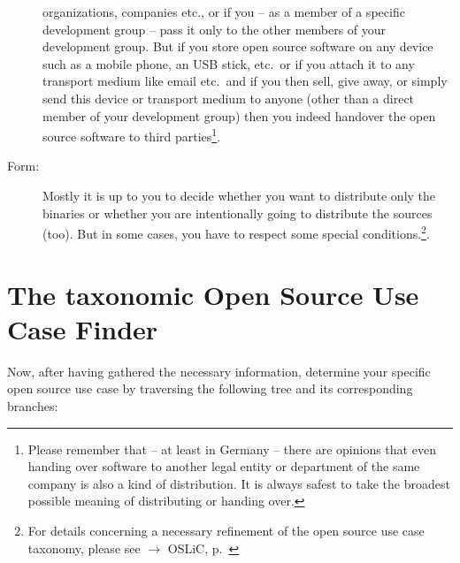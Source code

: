 \begin{description}
organizations, companies etc., or if you -- as a member of a specific
development group -- pass it only to the other members of your development
group. But if you store open source software on any device such as a mobile
phone, an USB stick, etc.\ or if you attach it to any transport medium like
email etc.\ and if you then sell, give away, or simply send this device or
transport medium to anyone (other than a direct member of your development
group) then you indeed handover the open source software to third
parties\footnote{Please remember that -- at least in Germany -- there are
opinions that even handing over software to another legal entity or department
of the same company is also a kind of distribution. It is always safest to take
the broadest possible meaning of distributing or handing over.}.
\item[Form:] Mostly it is up to you to decide whether you want to distribute
only the binaries or whether you are intentionally going to distribute the
sources (too). But in some cases, you have to respect some special
conditions.\footnote{For details concerning a necessary refinement of the open
source use case taxonomy, please see $\rightarrow$ OSLiC, p.\
\pageref{sec:SourceBinaryDifference}}.
\end{description}

\section{The taxonomic Open Source Use Case Finder}

Now, after having gathered the necessary information, determine your specific
open source use case by traversing the following tree and its corresponding
branches:

